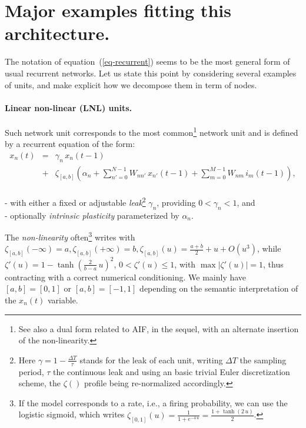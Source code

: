 \section{Major examples fitting this architecture.} \label{generality}

The notation of equation~(\ref{eq-recurrent}) seems to be the most general form of usual recurrent networks. Let us state this point by considering several examples of units, and make explicit how we decompose them in term of nodes.

\paragraph{Linear non-linear (LNL) units.} 

Such network unit corresponds to the most common\footnote{See also a dual form related to AIF, in the sequel, with an alternate insertion of the non-linearity.} network unit and is defined by a recurrent equation of the form:
\begin{equation}\label{lnl-network}
\begin{array}{rcl}x_n(t) &=& \gamma_n \, x_n(t-1) \\ &+& \zeta_{[a,b]}\left(\alpha_n + \sum_{n' = 0}^{N-1} W_{nn'} \, x_{n'}(t-1) + \sum_{m = 0}^{M-1} W_{nm} \, i_m(t-1)\right), \end{array}\end{equation}
\\- with either a fixed or adjustable {\em leak}\footnote{Here $\gamma = 1 - \frac{\Delta T}{\tau}$ stands for the leak of each unit, writing $\Delta T$ the sampling period, $\tau$ the continuous leak and using an basic trivial Euler discretization scheme, the $\zeta()$ profile being re-normalized accordingly.} $\gamma_n$, providing $0 < \gamma_n < 1$, and 
\\- optionally {\em intrinsic plasticity} parameterized by $\alpha_n$. 

The {\em non-linearity} often\footnote{If the model corresponds to a rate, i.e., a firing probability, we can use the logistic sigmoid, which writes $\zeta_{[0,1]}(u) = \frac{1}{1 + e^{-4 \, u}} = \frac{1 + \tanh(2 \, u)}{2}$.} writes
with $\zeta_{[a,b]}(-\infty) = a, \zeta_{[a,b]}(+\infty) = b, \zeta_{[a,b]}(u) = \frac{a+b}{2} + u + O(u^3)$,  while $\zeta'(u) = 1 - \tanh(\frac{2}{b-a} \, u)^2$,  $0 < \zeta'(u) \leq 1$, with $\max|\zeta'(u)| = 1$, thus contracting with a correct numerical conditioning. We mainly have $[a,b] = [0,1]$ or $[a,b] = [-1,1]$ depending on the semantic interpretation of the $x_n(t)$ variable.

